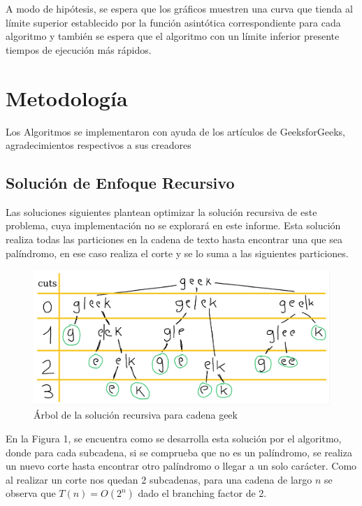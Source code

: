 \documentclass[12pt]{article}
\begin{document}
A modo de hipótesis, se espera que los gráficos muestren una curva que tienda al límite superior establecido por la función asintótica correspondiente para cada algoritmo y también se espera que el algoritmo con un límite inferior presente tiempos de ejecución más rápidos.

\newpage
\section{Metodología}

Los Algoritmos se implementaron con ayuda de los artículos de GeeksforGeeks, agradecimientos respectivos a sus creadores \cite{geeksforgeeks}

\subsection{Solución de Enfoque Recursivo}

Las soluciones siguientes plantean optimizar la solución recursiva de este problema, cuya implementación no se explorará en este informe. Esta solución realiza todas las particiones en la cadena de texto hasta encontrar una que sea palíndromo, en ese caso realiza el corte y se lo suma a las siguientes particiones.

\begin{figure}[ht]
    \centering
    \includegraphics[width=\textwidth]{rec.png}
    \caption{Árbol de la solución recursiva para cadena geek}
\end{figure}

En la Figura 1, se encuentra como se desarrolla esta solución por el algoritmo,
donde para cada subcadena, si se comprueba que no es un palíndromo, se realiza un nuevo corte hasta encontrar otro palíndromo o llegar a un solo carácter. Como al realizar un corte nos quedan 2 subcadenas, para una cadena de largo $n$ se observa que $T(n) = O(2^n)$ dado el branching factor de 2.
\end{document}

